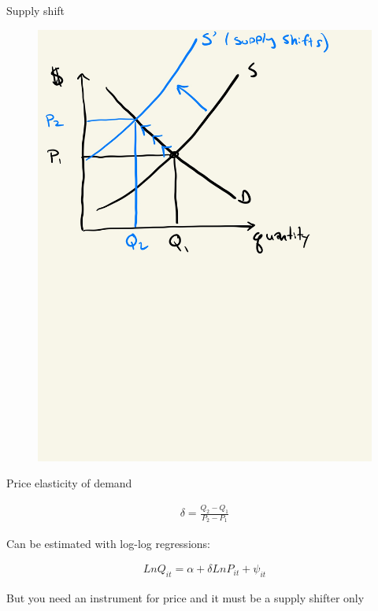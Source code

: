 \documentclass{beamer}
\begin{document}
\begin{frame}{Supply shift}

	\begin{figure}
	\includegraphics[scale=0.15]{./lecture_includes/elasticity_2.jpg}
	\end{figure}
\end{frame}


\begin{frame}{Price elasticity of demand}

\begin{eqnarray*}
\delta = \frac{Q_2 - Q_1}{P_2 - P_1}
\end{eqnarray*}

\bigskip

Can be estimated with log-log regressions:

\bigskip

\begin{eqnarray*}
Ln Q_{it} = \alpha + \delta Ln P_{it} + \psi_{it}
\end{eqnarray*}

\bigskip

But you need an instrument for price and it must be a supply shifter only


\end{frame}
\end{document}
